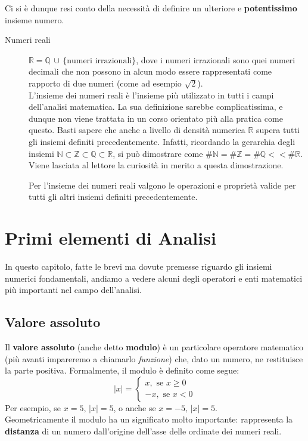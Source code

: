 \documentclass[12pt]{report}
\newcommand{\N}{\mathbb{N}}
\newcommand{\Z}{\mathbb{Z}}
\newcommand{\Q}{\mathbb{Q}}
\newcommand{\R}{\mathbb{R}}
\begin{document}
	Ci si è dunque resi conto della necessità di definire un ulteriore e \textbf{potentissimo} insieme numero.
	\begin{description}
		
		\item [Numeri reali] $\R = \Q\,\cup\,\{\text{numeri irrazionali}\}$, dove i numeri irrazionali sono quei numeri decimali che non possono in alcun modo essere rappresentati come rapporto di due numeri (come ad esempio $\sqrt{2}$).\\
		L'insieme dei numeri reali è l'insieme più utilizzato in tutti i campi dell'analisi matematica. La sua definizione sarebbe complicatissima, e dunque non viene trattata in un corso orientato più alla pratica come questo. Basti sapere che anche a livello di densità numerica $\R$ supera tutti gli insiemi definiti precedentemente. Infatti, ricordando la gerarchia degli insiemi $\N \subset \Z \subset \Q \subset \R$, si può dimostrare come $\#\N = \#\Z = \#\Q << \#\R$. Viene lasciata al lettore la curiosità in merito a questa dimostrazione.
		
		Per l'insieme dei numeri reali valgono le operazioni e proprietà valide per tutti gli altri insiemi definiti precedentemente.
		
	\end{description}
	
	\chapter{Primi elementi di Analisi}
	In questo capitolo, fatte le brevi ma dovute premesse riguardo gli insiemi numerici fondamentali, andiamo a vedere alcuni degli operatori e enti matematici più importanti nel campo dell'analisi.
	
	\section{Valore assoluto}
	Il \textbf{valore assoluto} (anche detto \textbf{modulo}) è un particolare operatore matematico (più avanti impareremo a chiamarlo \textit{funzione}) che, dato un numero, ne restituisce la parte positiva.
	Formalmente, il modulo è definito come segue:
	\[
		|x| =
		\begin{cases}
			x, \text{ se }x \geq 0\\
			-x, \text{ se }x < 0
		\end{cases}
	\]
	Per esempio, se $x = 5,\,|x| = 5$, o anche se $x = -5,\, |x| = 5$.\\
	Geometricamente il modulo ha un significato molto importante: rappresenta la \textbf{distanza} di un numero dall'origine dell'asse delle ordinate dei numeri reali.
	
\end{document}
